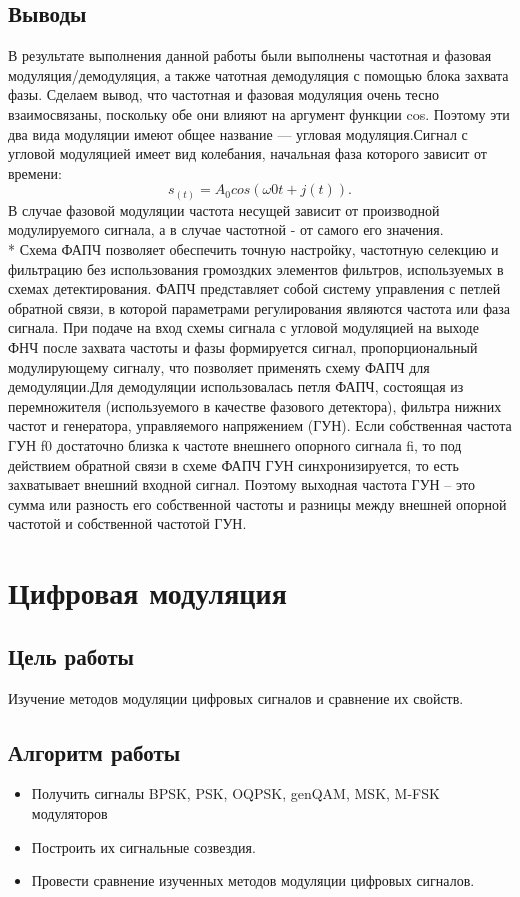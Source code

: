 \documentclass[10pt,a4paper]{article}
\begin{document}
\subsection{Выводы}
В результате выполнения данной работы были выполнены частотная и фазовая модуляция/демодуляция, а также чатотная демодуляция с  помощью блока захвата фазы. Сделаем вывод, что частотная и фазовая модуляция очень тесно взаимосвязаны, поскольку обе они влияют на аргумент функции cos. Поэтому эти два вида модуляции имеют общее название — угловая модуляция.Сигнал с угловой модуляцией имеет вид колебания, начальная фаза которого зависит от времени:
	\begin{equation}
	s_(t) = A_0 cos(\omega0 t + j(t)).
	\end{equation}
В случае фазовой модуляции частота несущей зависит от производной модулируемого сигнала, а в случае частотной - от самого его значения.\\*
Схема ФАПЧ позволяет обеспечить точную настройку, частотную селекцию и фильтрацию без использования громоздких элементов фильтров, используемых в схемах детектирования. ФАПЧ представляет собой систему управления с петлей обратной связи, в которой параметрами регулирования 
являются частота или фаза сигнала. При подаче на вход схемы сигнала с угловой модуляцией на выходе ФНЧ после захвата частоты и фазы формируется сигнал, пропорциональный модулирующему сигналу, что позволяет применять схему ФАПЧ для демодуляции.Для демодуляции использовалась петля ФАПЧ, состоящая из перемножителя (используемого в качестве фазового детектора), фильтра нижних частот и генератора, управляемого напряжением (ГУН). Если собственная частота ГУН f0 достаточно близка к частоте внешнего опорного сигнала fi, то под действием обратной связи в схеме ФАПЧ ГУН синхронизируется, то есть захватывает внешний входной сигнал. Поэтому выходная частота ГУН – это сумма или разность его собственной частоты и разницы между внешней опорной частотой и собственной частотой ГУН.

\section{Цифровая модуляция}
\subsection{Цель работы}
Изучение методов модуляции цифровых сигналов и сравнение их свойств. 
\subsection{Алгоритм работы}
\begin{itemize}
\item Получить сигналы BPSK, PSK, OQPSK, genQAM, MSK, M-FSK модуляторов 
\item Построить их сигнальные созвездия. 
\item Провести сравнение изученных методов модуляции цифровых сигналов. 
\end{itemize}
\end{document}
